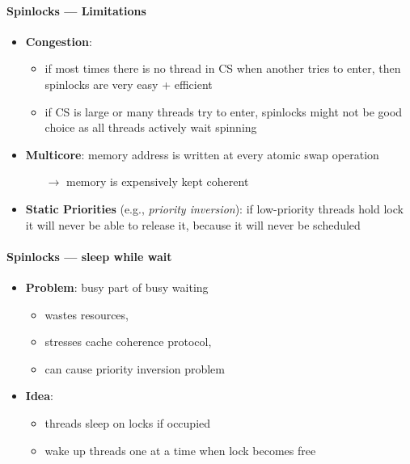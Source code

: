 \paragraph{Spinlocks --- Limitations}
\begin{itemize}
  \item \textbf{Congestion}:
  \begin{itemize}
    \item if most times there is no thread in CS when another tries to enter, then spinlocks are very easy + efficient
    \item if CS is large or many threads try to enter, spinlocks might not be good choice as all threads actively wait spinning
  \end{itemize}
  \item \textbf{Multicore}: memory address is written at every atomic swap operation
  \begin{itemize}
    \item[$ \to $] memory is expensively kept coherent
  \end{itemize}
  \item \textbf{Static Priorities} (e.g., \emph{priority inversion}): if low-priority threads hold lock it will never be able to release it, because it will never be scheduled
\end{itemize}

\paragraph{Spinlocks --- sleep while wait}
\begin{itemize}
  \item \textbf{Problem}: busy part of busy waiting
  \begin{itemize}
    \item wastes resources,
    \item stresses cache coherence protocol,
    \item can cause priority inversion problem
  \end{itemize}
  \item \textbf{Idea}:
  \begin{itemize}
    \item threads sleep on locks if occupied
    \item wake up threads one at a time when lock becomes free
  \end{itemize}
\end{itemize}

